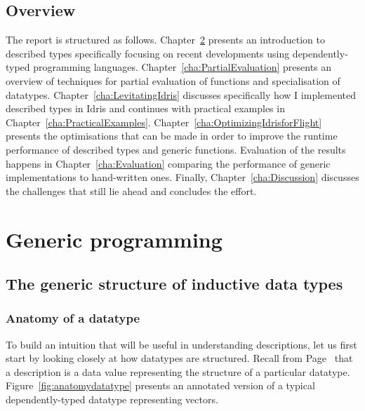 \documentclass{ituthesis}
\theoremstyle{break}
\begin{document}
\section{Overview}
\label{sec:Overview}

The report is structured as follows. Chapter~\ref{cha:GenericProgramming} presents an introduction to described types specifically focusing on recent developments using dependently-typed programming languages.
Chapter~\ref{cha:PartialEvaluation} presents an overview of techniques for partial evaluation of functions and specialisation of datatypes. Chapter~\ref{cha:LevitatingIdris} discusses specifically how I implemented described types in Idris and continues with practical examples in Chapter~\ref{cha:PracticalExamples}.
Chapter~\ref{cha:OptimizingIdrisforFlight} presents the optimisations that can be made in order to improve the runtime performance of described types and generic functions. Evaluation of the results happens in Chapter~\ref{cha:Evaluation} comparing the performance of generic implementations to hand-written ones.
Finally, Chapter~\ref{cha:Discussion} discusses the challenges that still lie ahead and concludes the effort.
\chapter{Generic programming}
\label{cha:GenericProgramming}
\section{The generic structure of inductive data types}
\label{sec:TheGenericStructureofInductiveDataTypes}
\subsection{Anatomy of a datatype}
\label{sub:AnatomyofaDatatype}
To build an intuition that will be useful in understanding descriptions, let us first start by looking closely at how datatypes are structured.
Recall from Page~\pageref{kw:desc} that a description is a data value representing the structure of a particular datatype.
Figure~\ref{fig:anatomydatatype} presents an annotated version of a typical dependently-typed datatype representing vectors.
\end{document}
